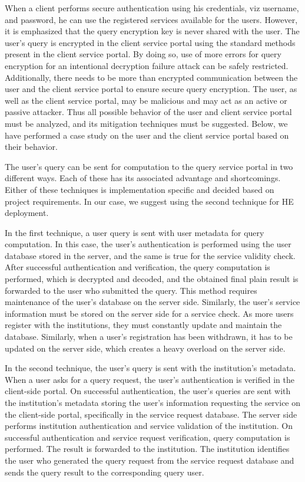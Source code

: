 When a client performs secure authentication using his credentials, viz username, and password, he can use the registered services available for the users. However, it is emphasized that the query encryption key is never shared with the user. The user's query is encrypted in the client service portal using the standard methods present in the client service portal. By doing so, use of more errors for query encryption for an intentional decryption failure attack can be safely restricted. Additionally, there needs to be more than encrypted communication between the user and the client service portal to ensure secure query encryption. The user, as well as the client service portal, may be malicious and may act as an active or passive attacker. Thus all possible behavior of the user and client service portal must be analyzed, and its mitigation techniques must be suggested. Below, we have performed a case study on the user and the client service portal based on their behavior.

The user's query can be sent for computation to the query service portal in two different ways. Each of these has its associated advantage and shortcomings. Either of these techniques is implementation specific and decided based on project requirements. In our case, we suggest using the second technique for HE deployment.

In the first technique, a user query is sent with user metadata for query computation. In this case, the user's authentication is performed using the user database stored in the server, and the same is true for the service validity check. After successful authentication and verification, the query computation is performed, which is decrypted and decoded, and the obtained final plain result is forwarded to the user who submitted the query. This method requires maintenance of the user's database on the server side. Similarly, the user's service information must be stored on the server side for a service check. As more users register with the institutions, they must constantly update and maintain the database. Similarly, when a user's registration has been withdrawn, it has to be updated on the server side, which creates a heavy overload on the server side.

In the second technique, the user's query is sent with the institution's metadata. When a user asks for a query request, the user's authentication is verified in the client-side portal. On successful authentication, the user's queries are sent with the institution's metadata storing the user's information requesting the service on the client-side portal, specifically in the service request database. The server side performs institution authentication and service validation of the institution. On successful authentication and service request verification, query computation is performed. The result is forwarded to the institution. The institution identifies the user who generated the query request from the service request database and sends the query result to the corresponding query user.



